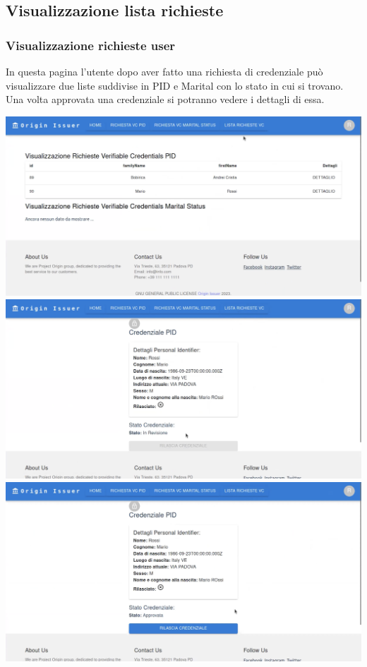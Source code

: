 \subsection{Visualizzazione lista richieste}
\subsubsection{Visualizzazione richieste user} 
In questa pagina l'utente dopo aver fatto una richiesta di credenziale può visualizzare due liste suddivise in PID e Marital con lo stato in cui si trovano. 
Una volta approvata una credenziale si potranno vedere i dettagli di essa.
\begin{center}
\includegraphics[scale = 0.2]{./res/img/issuer/lista/user/listaUser1.png}
\includegraphics[scale = 0.2]{./res/img/issuer/lista/user/listaUser2.png}
\includegraphics[scale = 0.2]{./res/img/issuer/lista/user/listaUser3.png}
\end{center}

